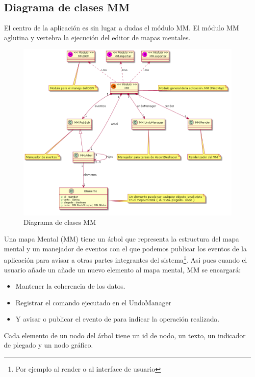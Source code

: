 \subsection{Diagrama de clases MM}

El centro de la aplicación es sin lugar a dudas el módulo MM. El módulo MM aglutina y vertebra la 
ejecución del editor de mapas mentales. 

\begin{figure}[tbph]
\centering
\includegraphics[width=\linewidth]{imagenes/diagrama-clases-mm}
\caption{Diagrama de clases MM}
\label{fig:diagrama-clases-mm}
\end{figure}

Una mapa Mental (MM) tiene un árbol que representa la estructura del mapa mental y un manejador de 
eventos con el que podemos publicar los eventos de la aplicación para avisar a otras partes integrantes del sistema\footnote{Por ejemplo al render o al interface de usuario}. Así pues cuando el usuario añade un añade un nuevo elemento al mapa mental, MM se encargará:

\begin{itemize}
\item Mantener la coherencia de los datos.
\item Registrar el comando ejecutado en el UndoManager
\item Y avisar o publicar el evento de para indicar la operación realizada.
\end{itemize}

Cada elemento de un nodo del árbol tiene un id de nodo, un texto, un indicador de plegado y un nodo gráfico.

